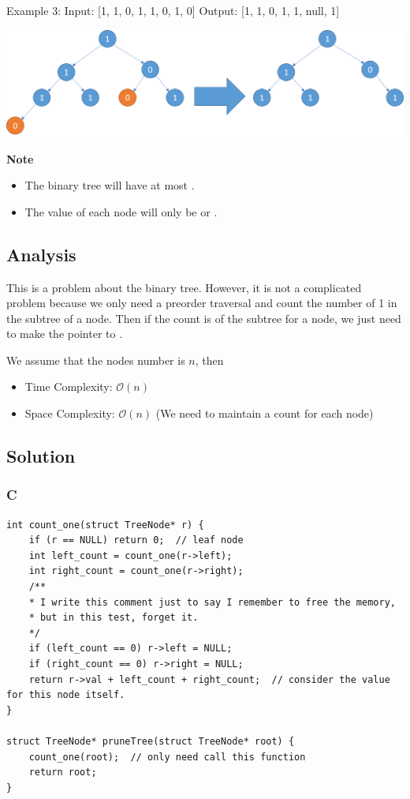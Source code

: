 \begin{example}
\begin{multilinecode}
Example 3:
Input: [1, 1, 0, 1, 1, 0, 1, 0]
Output: [1, 1, 0, 1, 1, null, 1]
\end{multilinecode}
\includegraphics*[width=14cm]{figs/algo_814_3}
\end{example}

\textbf{Note}
\begin{itemize}
\item The binary tree will have at most .
\item The value of each node will only be  or .
\end{itemize}

\subsection*{Analysis}
This is a problem about the binary tree. However, it is not a complicated problem because we only need a preorder traversal and count the number of 1 in the subtree of a node. Then if the count is  of the subtree for a node, we just need to make the pointer to .

We assume that the nodes number is $n$, then
\begin{itemize}
\item Time Complexity: $\mathcal{O}(n)$
\item Space Complexity: $\mathcal{O}(n)$ (We need to maintain a count for each node)
\end{itemize}

\subsection*{Solution}
\subsubsection*{C}
\begin{verbatim}
int count_one(struct TreeNode* r) {
    if (r == NULL) return 0;  // leaf node
    int left_count = count_one(r->left);
    int right_count = count_one(r->right);
    /**
    * I write this comment just to say I remember to free the memory,
    * but in this test, forget it.
    */
    if (left_count == 0) r->left = NULL;
    if (right_count == 0) r->right = NULL;
    return r->val + left_count + right_count;  // consider the value for this node itself.
}

struct TreeNode* pruneTree(struct TreeNode* root) {
    count_one(root);  // only need call this function
    return root;
}
\end{verbatim}

\newpage

